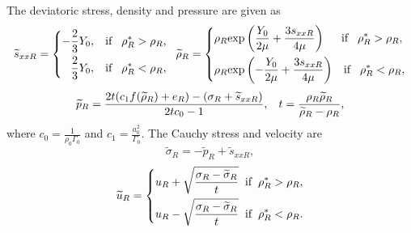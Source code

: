 \documentclass{article}
\numberwithin{equation}{section}
\numberwithin{table}{section}
\begin{document}
The deviatoric stress, density and pressure are given as 
\begin{equation}
  \widetilde{s}_{xxR} =\left\{ \begin{aligned}
	  -\frac{2}{3}Y_0, \hspace{0.3cm} \text{if} \hspace{0.3cm} \rho_R^* > \rho_R,\\
	  \frac{2}{3}Y_0, \hspace{0.3cm} \text{if} \hspace{0.3cm} \rho_R^* < \rho_R,\\
	\end{aligned}\right.
	\hspace{0.2cm} \widetilde{\rho}_{R} = \left\{ \begin{aligned}
	  & \rho_R \text{exp}\left(\frac{Y_0}{2\mu}+\frac{3 s_{xxR}}{4\mu}\right)  \hspace{0.5cm} \text{if} \hspace{0.3cm} \rho_R^* > \rho_R,\\ 
& \rho_R \text{exp}\left(-\frac{Y_0}{2\mu}+\frac{3 s_{xxR}}{4\mu}\right) 
\hspace{0.3cm} \text{if} \hspace{0.3cm} \rho_R^* < \rho_R,\\ 
  \end{aligned}\right.
 \end{equation}
\begin{equation}
  \widetilde{p}_R= \frac{2t(c_1f(\widetilde{\rho}_R)+e_R)-(\sigma_R+\widetilde{s}_{xxR})}{2tc_0-1}, \hspace{0.3cm} 
t=\frac{\rho_R \widetilde{\rho}_R}{\widetilde{\rho}_R-\rho_R},
\end{equation}
where $c_0 =\frac{1}{\rho_0 \Gamma_0}$ and $c_1 = \frac{a_0^2}{\Gamma_0}$.
The Cauchy stress and velocity are
\begin{equation}
\widetilde{\sigma}_R = -\widetilde{p}_R+\widetilde{s}_{xxR},
\end{equation}
\begin{equation}
  \widetilde{u}_R= \left\{
  \begin{aligned}
	u_R+\sqrt{\frac{\sigma_R-\widetilde{\sigma}_R}{t}} \hspace{0.2cm} \text{if} \hspace{0.2cm} \rho_R^* >\rho_R,\\
	u_R-\sqrt{\frac{\sigma_R-\widetilde{\sigma}_R}{t}} \hspace{0.2cm} \text{if} \hspace{0.2cm} \rho_R^* <\rho_R.\\
\end{aligned} \right.
\end{equation}
\end{document}
